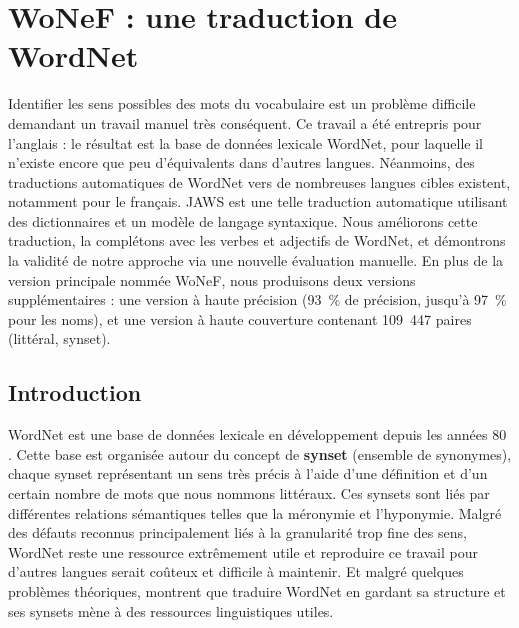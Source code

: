 \chapter{WoNeF : une traduction de WordNet}
\label{ch:wonef} 

Identifier les sens possibles des mots du vocabulaire est un problème difficile demandant un travail manuel très conséquent. Ce travail a été entrepris pour l'anglais : le résultat est la base de données lexicale WordNet, pour laquelle il n'existe encore que peu d'équivalents dans d'autres langues. Néanmoins, des traductions automatiques de WordNet vers de nombreuses langues cibles existent, notamment pour le français. JAWS est une telle traduction automatique utilisant des dictionnaires et un modèle de langage syntaxique. Nous améliorons cette traduction, la complétons avec les verbes et adjectifs de WordNet, et démontrons la validité de notre approche via une nouvelle évaluation manuelle. En plus de la version principale nommée WoNeF, nous produisons deux versions supplémentaires : une version à haute précision (93~\% de précision, jusqu'à 97~\% pour les noms), et une version à haute couverture contenant 109~447 paires (littéral, synset).


\section{Introduction}
\label{sec:intro}

WordNet est une base de données lexicale en développement depuis les années 80 \citep{fellbaum1998wordnet}. Cette base est organisée autour du concept de \textbf{synset} (ensemble de synonymes), chaque synset représentant un sens très précis à l'aide d'une définition et d'un certain nombre de mots que nous nommons littéraux. Ces synsets sont liés par différentes relations sémantiques telles que la méronymie et l'hyponymie. Malgré des défauts reconnus \citep{boyd2006adding} principalement liés à la granularité trop fine des sens, WordNet reste une ressource extrêmement utile et reproduire ce travail pour d'autres langues serait coûteux et difficile à maintenir. Et malgré quelques problèmes théoriques, \cite{fellbaum2007connecting,demelo2008utility} montrent que traduire WordNet en gardant sa structure et ses synsets mène à des ressources linguistiques utiles.

